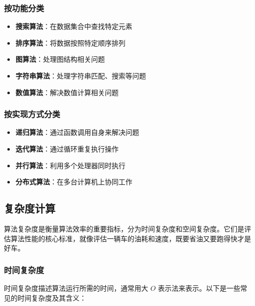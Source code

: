 \documentclass[lang=cn,newtx,10pt,scheme=chinese]{../elegantbook}
\begin{document}
\subsubsection{按功能分类}
\begin{itemize}
    \item \textbf{搜索算法}：在数据集合中查找特定元素
    \item \textbf{排序算法}：将数据按照特定顺序排列
    \item \textbf{图算法}：处理图结构相关问题
    \item \textbf{字符串算法}：处理字符串匹配、搜索等问题
    \item \textbf{数值算法}：解决数值计算相关问题
\end{itemize}

\subsubsection{按实现方式分类}
\begin{itemize}
    \item \textbf{递归算法}：通过函数调用自身来解决问题
    \item \textbf{迭代算法}：通过循环重复执行操作
    \item \textbf{并行算法}：利用多个处理器同时执行
    \item \textbf{分布式算法}：在多台计算机上协同工作
\end{itemize}

\subsection{复杂度计算}
算法复杂度是衡量算法效率的重要指标，分为时间复杂度和空间复杂度。它们是评估算法性能的核心标准，就像评估一辆车的油耗和速度，既要省油又要跑得快才是好车。

\subsubsection{时间复杂度}
时间复杂度描述算法运行所需的时间，通常用大 $O$ 表示法来表示。以下是一些常见的时间复杂度及其含义：
\end{document}
